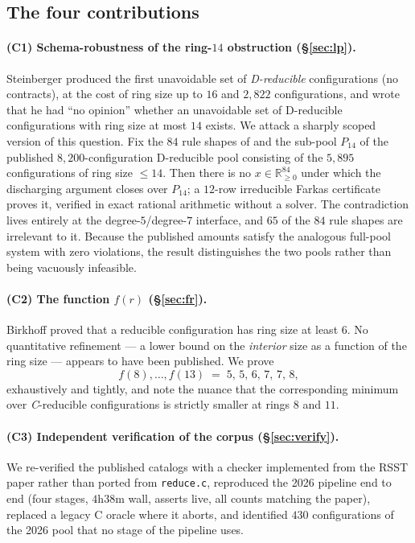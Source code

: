 \documentclass[11pt]{article}
\theoremstyle{definition}
\begin{document}
\subsection{The four contributions}

\paragraph{(C1) Schema-robustness of the ring-$14$ obstruction (\S\ref{sec:lp}).}
Steinberger \cite{steinberger2010} produced the first unavoidable set of
\emph{D-reducible} configurations (no contracts), at the cost of ring size up to
$16$ and $2{,}822$ configurations, and wrote that he had ``no opinion'' whether an
unavoidable set of D-reducible configurations with ring size at most $14$ exists.
We attack a sharply scoped version of this question. Fix the $84$ rule shapes of
\cite{nl4ct2026} and the sub-pool $P_{14}$ of the published $8{,}200$-configuration
D-reducible pool consisting of the $5{,}895$ configurations of ring size $\le 14$.
Then there is no $x \in \mathbb{R}^{84}_{\ge 0}$ under which the discharging
argument closes over $P_{14}$; a $12$-row irreducible Farkas certificate proves it,
verified in exact rational arithmetic without a solver. The contradiction lives
entirely at the degree-$5$/degree-$7$ interface, and $65$ of the $84$ rule shapes
are irrelevant to it. Because the published amounts satisfy the analogous full-pool
system with zero violations, the result distinguishes the two pools rather than
being vacuously infeasible.

\paragraph{(C2) The function $f(r)$ (\S\ref{sec:fr}).} Birkhoff \cite{birkhoff1913}
proved that a reducible configuration has ring size at least $6$. No quantitative
refinement --- a lower bound on the \emph{interior} size as a function of the ring
size --- appears to have been published. We prove
\[
  f(8),\dots,f(13) \;=\; 5,\,5,\,6,\,7,\,7,\,8,
\]
exhaustively and tightly, and note the nuance that the corresponding minimum over
\emph{C}-reducible configurations is strictly smaller at rings $8$ and $11$.

\paragraph{(C3) Independent verification of the corpus (\S\ref{sec:verify}).} We
re-verified the published catalogs with a checker implemented from the RSST paper
\cite{rsst-reduce} rather than ported from \texttt{reduce.c}, reproduced the 2026
pipeline end to end (four stages, $4$h$38$m wall, asserts live, all counts matching
the paper), replaced a legacy C oracle where it aborts, and identified $430$
configurations of the 2026 pool that no stage of the pipeline uses.
\end{document}
